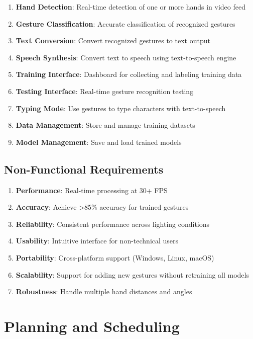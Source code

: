 \begin{enumerate}
    \item \textbf{Hand Detection}: Real-time detection of one or more hands in video feed
    \item \textbf{Gesture Classification}: Accurate classification of recognized gestures
    \item \textbf{Text Conversion}: Convert recognized gestures to text output
    \item \textbf{Speech Synthesis}: Convert text to speech using text-to-speech engine
    \item \textbf{Training Interface}: Dashboard for collecting and labeling training data
    \item \textbf{Testing Interface}: Real-time gesture recognition testing
    \item \textbf{Typing Mode}: Use gestures to type characters with text-to-speech
    \item \textbf{Data Management}: Store and manage training datasets
    \item \textbf{Model Management}: Save and load trained models
\end{enumerate}

\subsection{Non-Functional Requirements}

\begin{enumerate}
    \item \textbf{Performance}: Real-time processing at 30+ FPS
    \item \textbf{Accuracy}: Achieve >85\% accuracy for trained gestures
    \item \textbf{Reliability}: Consistent performance across lighting conditions
    \item \textbf{Usability}: Intuitive interface for non-technical users
    \item \textbf{Portability}: Cross-platform support (Windows, Linux, macOS)
    \item \textbf{Scalability}: Support for adding new gestures without retraining all models
    \item \textbf{Robustness}: Handle multiple hand distances and angles
\end{enumerate}

\section{Planning and Scheduling}

